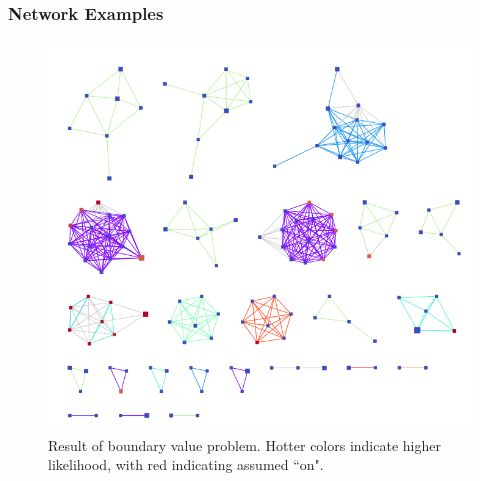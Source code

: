 \documentclass{beamer}
\begin{document}
\begin{frame}
\frametitle{Network Examples}
\begin{figure}
	\begin{center}
	\includegraphics[scale = 0.25]{ranked_bdvp.png}	
\end{center}
\caption{Result of boundary value problem. Hotter colors indicate higher likelihood, with red indicating assumed ``on".}
\end{figure}
\end{frame}

%
%
%
%
\end{document}
